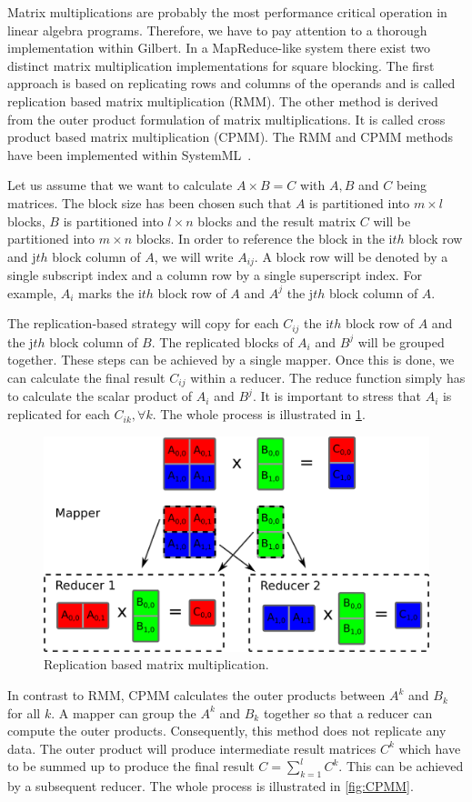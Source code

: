 Matrix multiplications are probably the most performance critical operation in linear algebra programs.
Therefore, we have to pay attention to a thorough implementation within Gilbert.
In a MapReduce-like system there exist two distinct matrix multiplication implementations for square blocking.
The first approach is based on replicating rows and columns of the operands and is called replication based matrix multiplication (RMM).
The other method is derived from the outer product formulation of matrix multiplications.
It is called cross product based matrix multiplication (CPMM).
The RMM and CPMM methods have been implemented within SystemML~\cite{ghoting:2011a}.

Let us assume that we want to calculate $A \times B = C$ with $A,B$ and $C$ being matrices.
The block size has been chosen such that $A$ is partitioned into $m\times l$ blocks, $B$ is partitioned into $l \times n$ blocks and the result matrix $C$ will be partitioned into $m\times n$ blocks.
In order to reference the block in the i$th$ block row and j$th$ block column of $A$, we will write $A_{ij}$.
A block row will be denoted by a single subscript index and a column row by a single superscript index.
For example, $A_i$ marks the i$th$ block row of $A$ and $A^j$ the j$th$ block column of $A$.

The replication-based strategy will copy for each $C_{ij}$ the i$th$ block row of $A$ and the j$th$ block column of $B$.
The replicated blocks of $A_i$ and $B^j$ will be grouped together.
These steps can be achieved by a single mapper.
Once this is done, we can calculate the final result $C_{ij}$ within a reducer.
The reduce function simply has to calculate the scalar product of $A_i$ and $B^j$.
It is important to stress that $A_i$ is replicated for each $C_{ik},\forall k$.
The whole process is illustrated in \cref{fig:RMM}.

\begin{figure}[!h]
	\centering
	\includegraphics[width=0.4\linewidth]{images/rmm.png}
	\caption{Replication based matrix multiplication.}
	\label{fig:RMM}
\end{figure}

In contrast to RMM, CPMM calculates the outer products between $A^k$ and $B_k$ for all $k$.
A mapper can group the $A^k$ and $B_k$ together so that a reducer can compute the outer products.
Consequently, this method does not replicate any data.
The outer product will produce intermediate result matrices $C^k$ which have to be summed up to produce the final result $C=\sum_{k=1}^{l} C^k$.
This can be achieved by a subsequent reducer.
The whole process is illustrated in \cref{fig:CPMM}.


